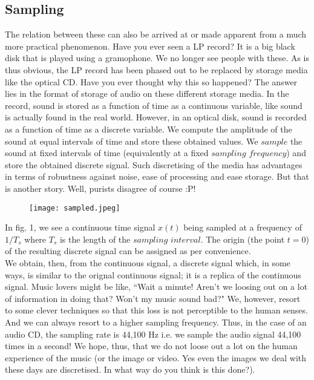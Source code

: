 \subsection{Sampling}
The relation between these can also be arrived at or made apparent from a much more practical phenomenon. Have you ever seen a LP record? It is a big black disk that is played using a gramophone. We no longer see people with these. As is thus obvious, the LP record has been phased out to be replaced by storage media like the optical CD. Have you ever thought why this so happened? The answer lies in the format of storage of audio on these different storage media. In the record, sound is stored as a function of time as a continuous variable, like sound is actually found in the real world. However, in an optical disk, sound is recorded as a function of time as a discrete variable. We compute the amplitude of the sound at equal intervals of time and store these obtained values. We $sample$ the sound at fixed intervals of time (equivalently at a fixed $sampling$ $frequency$) and store the obtained discrete signal. Such discretising of the media has advantages in terms of robustness against noise, ease of processing and ease storage. But that is another story. Well, purists disagree of course :P!\\

\begin{figure}
  \texttt{[image: sampled.jpeg]}
\end{figure}

In fig. 1, we see a continuous time signal $x(t)$ being sampled at a frequency of $1/T_{s}$ where $T_{s}$ is the length of the $sampling$ $interval$. The origin (the point $t=0$) of the resulting discrete signal can be assigned as per convenience.\\

We obtain, then, from the continuous signal, a discrete signal which, in some ways, is similar to the orignal continuous signal; it is a replica of the continuous signal. Music lovers might be like, ``Wait a minute! Aren't we loosing out on a lot of information in doing that? Won't my music sound bad?" We, however, resort to some clever techniques so that this loss is not perceptible to the human senses. And we can always resort to a higher sampling frequency. Thus, in the case of an audio CD, the sampling rate is 44,100 Hz i.e. we sample the audio signal 44,100 times in a second! We hope, thus, that we do not loose out a lot on the human experience of the music (or the image or video. Yes even the images we deal with these days are discretised. In what way do you think is this done?).\\

